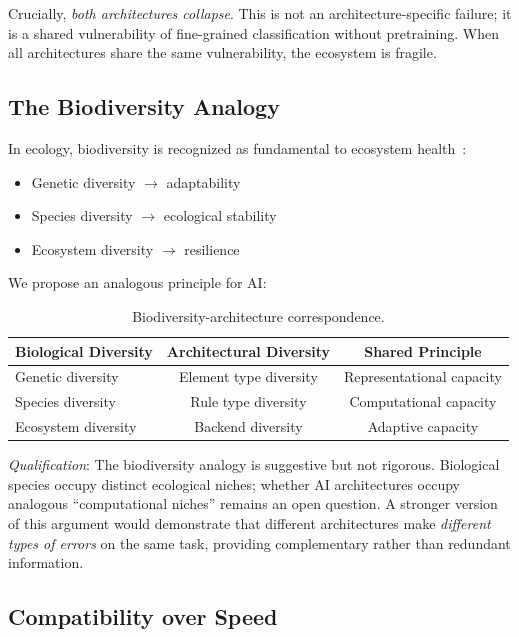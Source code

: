 \documentclass{article}
\begin{document}
Crucially, \textit{both architectures collapse}. This is not an architecture-specific failure; it is a shared vulnerability of fine-grained classification without pretraining. When all architectures share the same vulnerability, the ecosystem is fragile.

\subsection{The Biodiversity Analogy}

In ecology, biodiversity is recognized as fundamental to ecosystem health~\citep{wilson1992}:

\begin{itemize}
\item Genetic diversity $\rightarrow$ adaptability
\item Species diversity $\rightarrow$ ecological stability
\item Ecosystem diversity $\rightarrow$ resilience
\end{itemize}

We propose an analogous principle for AI:

\begin{table}[h]
\centering
\caption{Biodiversity-architecture correspondence.}
\label{tab:biodiversity}
\begin{tabular}{lcc}
\toprule
\textbf{Biological Diversity} & \textbf{Architectural Diversity} & \textbf{Shared Principle} \\
\midrule
Genetic diversity & Element type diversity & Representational capacity \\
Species diversity & Rule type diversity & Computational capacity \\
Ecosystem diversity & Backend diversity & Adaptive capacity \\
\end{tabular}
\end{table}

\textit{Qualification}: The biodiversity analogy is suggestive but not rigorous. Biological species occupy distinct ecological niches; whether AI architectures occupy analogous ``computational niches'' remains an open question. A stronger version of this argument would demonstrate that different architectures make \textit{different types of errors} on the same task, providing complementary rather than redundant information.

\subsection{Compatibility over Speed}
\end{document}
